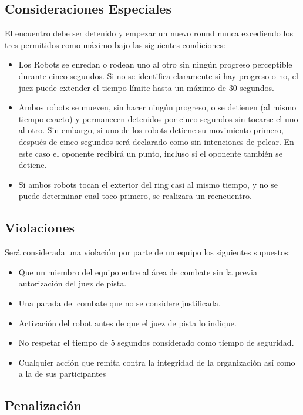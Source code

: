 \documentclass[12pt]{book}
\theoremstyle{definition}
\theoremstyle{remark}
\theoremstyle{plain}
\begin{document}
\subsection{Consideraciones Especiales}

El encuentro debe ser detenido y empezar un nuevo round nunca excediendo los tres permitidos como máximo bajo las siguientes condiciones: 

\begin{itemize}
 \item Los Robots se enredan o rodean uno al otro sin ningún progreso perceptible durante cinco segundos. Si no se identifica claramente
 si hay progreso o no, el juez puede extender el tiempo límite hasta un máximo de 30 segundos. 
 \item Ambos robots se mueven, sin hacer ningún progreso, o se detienen (al mismo tiempo exacto) y permanecen detenidos por cinco segundos sin tocarse el uno al otro. 
Sin embargo, si uno de los robots detiene su movimiento primero, después de cinco segundos será declarado como sin intenciones de pelear. En este caso el oponente 
recibirá un punto, incluso si el oponente también se detiene. 
 \item Si ambos robots tocan el exterior del ring casi al mismo tiempo, y no se puede determinar cual toco primero, se realizara un reencuentro. 
\end{itemize}

\subsection{Violaciones}
Será considerada una violación por parte de un equipo los siguientes supuestos: 
\begin{itemize}
 \item Que un miembro del equipo entre al área de combate sin la previa autorización del juez de pista. 
 \item Una parada del combate que no se considere justificada. 
 \item Activación del robot antes de que el juez de pista lo indique. 
 \item No respetar el tiempo de 5 segundos considerado como tiempo de seguridad. 
 \item Cualquier acción que remita contra la integridad de la organización así como a la de sus participantes
\end{itemize}

\subsection{Penalización}
\end{document}
